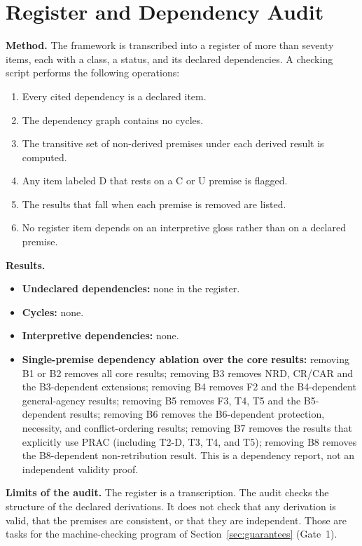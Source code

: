 \documentclass[11pt]{article}
\begin{document}
\section{Register and Dependency Audit}\label{app:audit}
\textbf{Method.} The framework is transcribed into a register of more than seventy items, each with a class, a status, and its declared dependencies. A checking script performs the following operations:
\begin{enumerate}
\item Every cited dependency is a declared item.
\item The dependency graph contains no cycles.
\item The transitive set of non-derived premises under each derived result is computed.
\item Any item labeled D that rests on a C or U premise is flagged.
\item The results that fall when each premise is removed are listed.
\item No register item depends on an interpretive gloss rather than on a declared premise.
\end{enumerate}
\textbf{Results.}
\begin{itemize}
\item \textbf{Undeclared dependencies:} none in the register.
\item \textbf{Cycles:} none.
\item \textbf{Interpretive dependencies:} none.
\item \textbf{Single-premise dependency ablation over the core results:} removing B1 or B2 removes all core results; removing B3 removes NRD, CR/CAR and the B3-dependent extensions; removing B4 removes F2 and the B4-dependent general-agency results; removing B5 removes F3, T4, T5 and the B5-dependent results; removing B6 removes the B6-dependent protection, necessity, and conflict-ordering results; removing B7 removes the results that explicitly use PRAC (including T2-D, T3, T4, and T5); removing B8 removes the B8-dependent non-retribution result. This is a dependency report, not an independent validity proof.
\end{itemize}
\textbf{Limits of the audit.} The register is a transcription. The audit checks the structure of the declared derivations. It does not check that any derivation is valid, that the premises are consistent, or that they are independent. Those are tasks for the machine-checking program of Section~\ref{sec:guarantees} (Gate~1).
\end{document}
